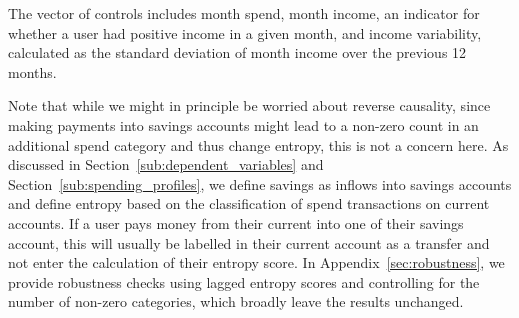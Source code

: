 The vector of controls includes month spend, month income, an indicator for
whether a user had positive income in a given month, and income
variability, calculated as the standard deviation of month income over the
previous 12 months.

Note that while we might in principle be worried about reverse causality, since
making payments into savings accounts might lead to a non-zero count in an
additional spend category and thus change entropy, this is not a concern here.
As discussed in Section~\ref{sub:dependent_variables} and
Section~\ref{sub:spending_profiles}, we define savings as inflows into savings
accounts and define entropy based on the classification of spend transactions
on current accounts. If a user pays money from their current into one of their
savings account, this will usually be labelled in their current account as a
transfer and not enter the calculation of their entropy score. In
Appendix~\ref{sec:robustness}, we provide robustness checks using lagged
entropy scores and controlling for the number of non-zero categories, which
broadly leave the results unchanged.

